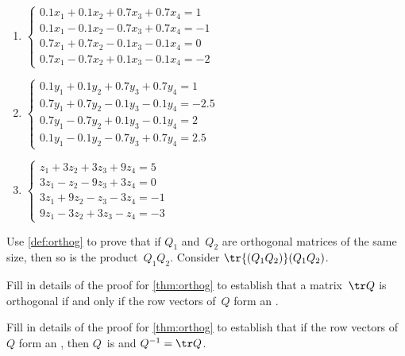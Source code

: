\begin{exercise}
\begin{enumerate}
\item \(\begin{cases}
0.1x_1+0.1x_2+0.7x_3+0.7x_4=1
\\0.1x_1-0.1x_2-0.7x_3+0.7x_4=-1
\\0.7x_1+0.7x_2-0.1x_3-0.1x_4=0
\\0.7x_1-0.7x_2+0.1x_3-0.1x_4=-2
\end{cases}\)

\item \(\begin{cases}
0.1y_1+0.1y_2+0.7y_3+0.7y_4=1
\\0.7y_1+0.7y_2-0.1y_3-0.1y_4=-2.5
\\0.7y_1-0.7y_2+0.1y_3-0.1y_4=2
\\0.1y_1-0.1y_2-0.7y_3+0.7y_4=2.5
\end{cases}\)

\item \(\begin{cases}
  z_1+3z_2+3z_3+9z_4=5
\\3z_1-z_2-9z_3+3z_4=0
\\3z_1+9z_2-z_3-3z_4=-1
\\9z_1-3z_2+3z_3-z_4=-3
\end{cases}\)

\end{enumerate}
\end{exercise}




\begin{exercise}\label{ex:orthoprod} 
Use \autoref{def:orthog} to prove that if \(Q_1\) and~\(Q_2\) are orthogonal matrices of the same size, then so is the product~\(Q_1Q_2\). 
Consider \(\tr{(Q_1Q_2)}(Q_1Q_2)\).
\end{exercise}

\begin{exercise} \label{ex:} 
Fill in details of the proof for \autoref{thm:orthog} to establish that a matrix~\(\tr Q\) is orthogonal if and only if the {row vector}s of~\(Q\) form an .
\end{exercise}

\begin{exercise} \label{ex:} 
Fill in details of the proof for \autoref{thm:orthog} to establish that if the row vectors of~\(Q\) form an , then \(Q\)~is  and \(Q^{-1}=\tr Q\).
\end{exercise}


